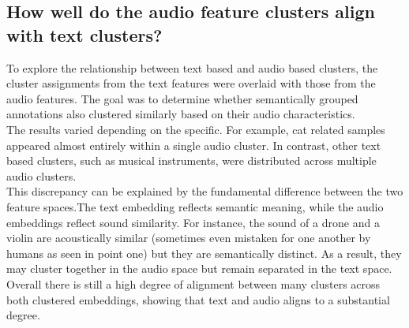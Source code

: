 \subsection{How well do the audio feature clusters align with text clusters?}
\label{sec:Text Features:c}


To explore the relationship between text based and audio based clusters, the cluster assignments from the text features were overlaid with those from the audio features. The goal was to determine whether semantically grouped annotations also clustered similarly based on their audio characteristics.\\
The results varied depending on the specific. For example, cat related samples appeared almost entirely within a single audio cluster. In contrast, other text based clusters, such as musical instruments, were distributed across multiple audio clusters.\\
This discrepancy can be explained by the fundamental difference between the two feature spaces.The text embedding reflects semantic meaning, while the audio embeddings reflect sound similarity. For instance, the sound of a drone and a violin are acoustically similar (sometimes even mistaken for one another by humans as seen in point one) but they are semantically distinct. As a result, they may cluster together in the audio space but remain separated in the text space.\\
Overall there is still a high degree of alignment between many clusters across both clustered embeddings, showing that text and audio aligns to a substantial degree.


